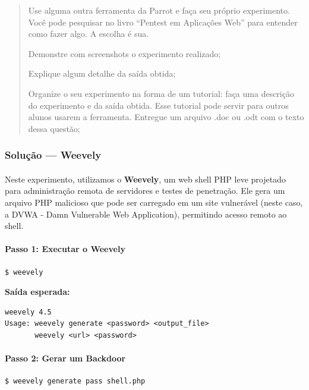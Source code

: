 \documentclass[12pt]{article}
\begin{document}
\begin{quote}
Use alguma outra ferramenta da Parrot e faça seu próprio experimento. Você pode pesquisar no livro ``Pentest em
  Aplicações Web'' para entender como fazer algo. A escolha é sua. 
  \item Demonstre com screenshots o experimento realizado;
  \item Explique algum detalhe da saída obtida;
  \item Organize o seu experimento na forma de um tutorial: faça uma descrição do experimento e da saída obtida. Esse
    tutorial pode servir para outros alunos usarem a ferramenta. Entregue um arquivo .doc ou .odt com o texto dessa
    questão;
\end{quote}

\subsubsection{Solução --- \textbf{Weevely}}

\paragraph{}Neste experimento, utilizamos o \textbf{Weevely}, um web shell PHP leve projetado para administração remota de servidores e testes de penetração. Ele gera um arquivo PHP malicioso que pode ser carregado em um site vulnerável (neste caso, a DVWA - Damn Vulnerable Web Application), permitindo acesso remoto ao shell.

\paragraph{Passo 1: Executar o Weevely}

\begin{lstlisting}
$ weevely
\end{lstlisting}

\textbf{Saída esperada:}

\begin{lstlisting}
weevely 4.5
Usage: weevely generate <password> <output_file>
       weevely <url> <password>
\end{lstlisting}

\paragraph{Passo 2: Gerar um Backdoor}

\begin{lstlisting}
$ weevely generate pass shell.php
\end{lstlisting}
\end{document}

